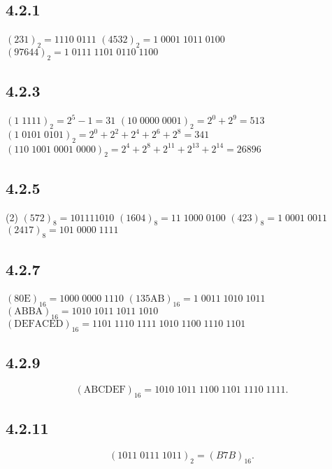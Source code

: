 \documentclass[12pt,titlepage]{extarticle}
\begin{document}
\subsection*{4.2.1}
\begin{tasks}
    \task $(231)_2 = 1110\;0111$
    \task $(4532)_2 = 1\; 0001\; 1011\; 0100$
    \task $(97644)_2 = 1\; 0111\; 1101\; 0110\; 1100$
\end{tasks}

\subsection*{4.2.3}
\begin{tasks}
    \task $(1\; 1111)_2 = 2^5 - 1 = 31$
    \task $(10\; 0000\; 0001)_2 = 2^0 + 2^9 = 513$
    \task $(1\; 0101\; 0101)_2 = 2^0 + 2^2 + 2^4 + 2^6 + 2^8 = 341$
    \task $(110\; 1001\; 0001\; 0000)_2 = 2^4 + 2^8 + 2^11 + 2^13 + 2^14 = 26896$
\end{tasks}

\subsection*{4.2.5}
\begin{tasks}(2)
    \task $(572)_8 = 101111010$
    \task $(1604)_8 = 11\; 1000\; 0100$
    \task $(423)_8 = 1\; 0001\; 0011$
    \task $(2417)_8 = 101\; 0000\; 1111$
\end{tasks}

\subsection*{4.2.7}
\begin{tasks}
    \task $(80\text{E})_{16} = 1000\; 0000\; 1110$
    \task $(135\text{AB})_{16} = 1\; 0011\; 1010\; 1011$
    \task $(\text{ABBA})_{16} = 1010\; 1011\; 1011\; 1010$
    \task $(\text{DEFACED})_{16} = 1101\; 1110\; 1111\; 1010\; 1100\; 1110\; 1101$
\end{tasks}

\subsection*{4.2.9}
\[
    (\text{ABCDEF})_{16} = 1010\; 1011\; 1100\; 1101\; 1110\; 1111
.\]

\subsection*{4.2.11}
\[
    (1011\; 0111\; 1011)_2 = (B7B)_{16}
.\]
\end{document}
